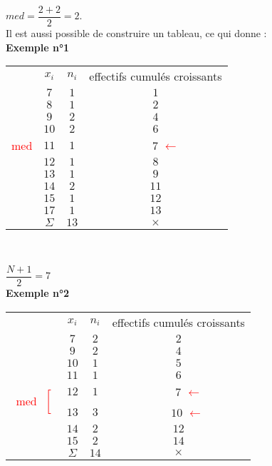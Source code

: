 $med = \dfrac{2 + 2}{2} = 2$. \\

Il est aussi possible de construire un tableau, ce qui donne : \\

\textbf{Exemple n°1} \\

\begin{tabular}{rc|c|c}
&$x_i$ & $n_i$ & effectifs cumulés croissants \\
\cline{2-4}
& $7$ & $1$ & $1$ \\
& $8$ & $1$ & $2$ \\
& $9$ & $2$ & $4$ \\
& $10$ & $2$ & $6$ \\
\textcolor{red}{med} & $11$ & $1$ & $\quad \; \; \; 7$ 
                  \textcolor{red}{\Large $\leftarrow$} \\
& $12$ & $1$ & $8$ \\
& $13$ & $1$ & $9$ \\
& $14$ & $2$ & $11$ \\
& $15$ & $1$ & $12$ \\
& $17$ & $1$ & $13$ \\
\cline{2-4}
& $\Sigma$ & $13$ & {\Large $\times$} \\ 
\end{tabular} \\

\hspace*{.5 cm}


$\dfrac{N + 1}{2} = 7 $ \\

\textbf{Exemple n°2} \\

\begin{tabular}{rc|c|c}
& $x_i$ & $n_i$ & effectifs cumulés croissants \\
\cline{2-4}
& $7$ & $2$ & $2$ \\
& $9$ & $2$ & $4$ \\
& $10$ & $1$ & $5$ \\
 & $11$ & $1$ & $6$\\
\multirow{2}{1cm}{\textcolor{red}{ $\left.\begin{array}{c}
\\
\mathrm {med}\\
\end{array} \right[$}}& $12$ & $1$ & $\quad \; \; \; 7$ \textcolor{red}{\Large $\leftarrow$} \\
& $13$ & $3$ & $\quad \; \; 10$ \textcolor{red}{\Large $\leftarrow$} \\
& $14$ & $2$ & $12$ \\
& $15$ & $2$ & $14$ \\
\cline{2-4}
& $\Sigma$ & $14$ & {\Large $\times$} \\ 
\end{tabular} \\

